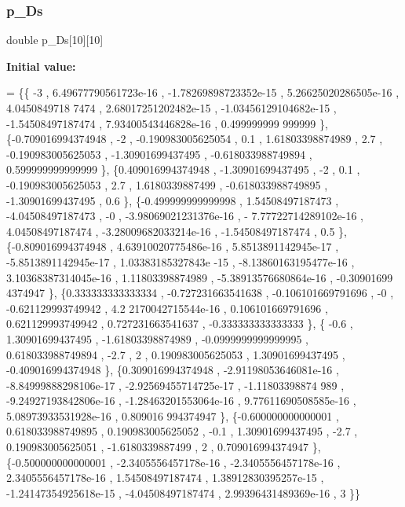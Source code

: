 \subsubsection{\texorpdfstring{p\+\_\+\+Ds}{p\_Ds}}
{\footnotesize\ttfamily double p\+\_\+\+Ds\mbox{[}10\mbox{]}\mbox{[}10\mbox{]}}

{\bfseries Initial value\+:}
\begin{DoxyCode}
= \{\{               -3 , 6.49677790561723e-16 , -1.78269898723352e-15 , 5.26625020286505e-16 ,  4.0450849718
      7474 , 2.68017251202482e-15 , -1.03456129104682e-15 , -1.54508497187474 , 7.93400543446828e-16 , 0.499999999
      999999 \},
\{-0.709016994374948 ,                -2 , -0.190983005625054 ,               0.1 ,  1.61803398874989 ,     
                2.7 , -0.190983005625053 , -1.30901699437495 , -0.618033988749894 , 0.599999999999999 \},
\{0.409016994374948 , -1.30901699437495 ,                -2 ,               0.1 , -0.190983005625053 ,      
               2.7 ,   1.6180339887499 , -0.618033988749895 , -1.30901699437495 ,               0.6 \},
\{-0.499999999999998 ,  1.54508497187473 , -4.04508497187473 ,                -0 , -3.98069021231376e-16 , -
      7.77722714289102e-16 ,  4.04508497187474 , -3.28009682033214e-16 , -1.54508497187474 ,               0.5 \},
\{-0.809016994374948 , 4.63910020775486e-16 , 5.8513891142945e-17 , -5.8513891142945e-17 , 1.03383185327843e
      -15 , -8.13860163195477e-16 , 3.10368387314045e-16 ,  1.11803398874989 , -5.38913576680864e-16 , -0.30901699
      4374947 \},
\{0.333333333333334 , -0.727231663541638 , -0.106101669791696 ,                -0 , -0.621129993749942 , 4.2
      2170042715544e-16 , 0.106101669791696 , 0.621129993749942 , 0.727231663541637 , -0.333333333333333 \},
\{             -0.6 ,  1.30901699437495 , -1.61803398874989 , -0.0999999999999995 , 0.618033988749894 ,     
               -2.7 ,                 2 , 0.190983005625053 ,  1.30901699437495 , -0.409016994374948 \},
\{0.309016994374948 , -2.91198053646081e-16 , -8.84999888298106e-17 , -2.92569455714725e-17 , -1.11803398874
      989 , -9.24927193842806e-16 , -1.28463201553064e-16 , 9.77611690508585e-16 , 5.08973933531928e-16 , 0.809016
      994374947 \},
\{-0.600000000000001 , 0.618033988749895 , 0.190983005625052 ,              -0.1 ,  1.30901699437495 ,      
              -2.7 , 0.190983005625051 ,  -1.6180339887499 ,                 2 , 0.709016994374947 \},
\{-0.500000000000001 , -2.3405556457178e-16 , -2.3405556457178e-16 , 2.3405556457178e-16 ,  1.54508497187474
       , 1.38912830395257e-15 , -1.24147354925618e-15 , -4.04508497187474 , 2.99396431489369e-16 ,                
       3 \}\}
\end{DoxyCode}
\mbox{\label{a00512_a9e8002d4e70ec8468d74e26db0e92bda}} 
